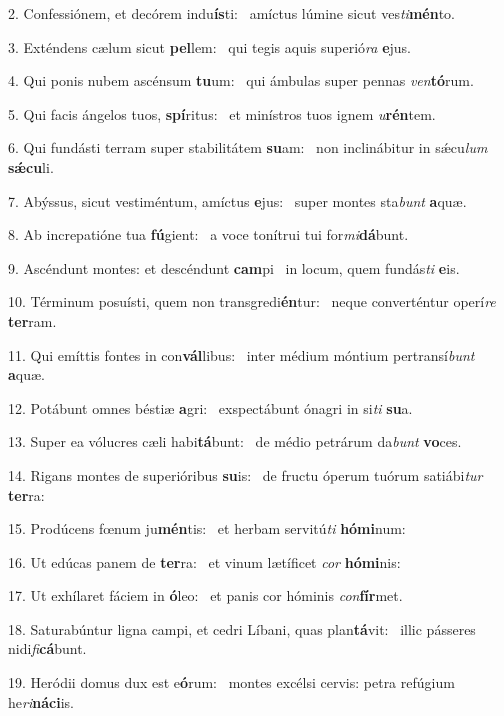 2. Confessiónem, et decórem indu\textbf{ís}ti: \ast\  amíctus lúmine sicut ves\textit{ti}\textbf{mén}to.\

3. Exténdens cælum sicut \textbf{pel}lem: \ast\  qui tegis aquis superió\textit{ra} \textbf{e}jus.\

4. Qui ponis nubem ascénsum \textbf{tu}um: \ast\  qui ámbulas super pennas \textit{ven}\textbf{tó}rum.\

5. Qui facis ángelos tuos, \textbf{spí}ritus: \ast\  et minístros tuos ignem \textit{u}\textbf{rén}tem.\

6. Qui fundásti terram super stabilitátem \textbf{su}am: \ast\  non inclinábitur in sǽcu\textit{lum} \textbf{sǽ}\textbf{cu}li.\

7. Abýssus, sicut vestiméntum, amíctus \textbf{e}jus: \ast\  super montes sta\textit{bunt} \textbf{a}quæ.\

8. Ab increpatióne tua \textbf{fú}gient: \ast\  a voce tonítrui tui for\textit{mi}\textbf{dá}bunt.\

9. Ascéndunt montes: et descéndunt \textbf{cam}pi \ast\  in locum, quem fundás\textit{ti} \textbf{e}is.\

10. Términum posuísti, quem non transgredi\textbf{én}tur: \ast\  neque converténtur operí\textit{re} \textbf{ter}ram.\

11. Qui emíttis fontes in con\textbf{vál}libus: \ast\  inter médium móntium pertransí\textit{bunt} \textbf{a}quæ.\

12. Potábunt omnes béstiæ \textbf{a}gri: \ast\  exspectábunt ónagri in si\textit{ti} \textbf{su}a.\

13. Super ea vólucres cæli habi\textbf{tá}bunt: \ast\  de médio petrárum da\textit{bunt} \textbf{vo}ces.\

14. Rigans montes de superióribus \textbf{su}is: \ast\  de fructu óperum tuórum satiábi\textit{tur} \textbf{ter}ra:\

15. Prodúcens fœnum ju\textbf{mén}tis: \ast\  et herbam servitú\textit{ti} \textbf{hó}\textbf{mi}num:\

16. Ut edúcas panem de \textbf{ter}ra: \ast\  et vinum lætíficet \textit{cor} \textbf{hó}\textbf{mi}nis:\

17. Ut exhílaret fáciem in \textbf{ó}leo: \ast\  et panis cor hóminis \textit{con}\textbf{fír}met.\

18. Saturabúntur ligna campi, et cedri Líbani, quas plan\textbf{tá}vit: \ast\  illic pásseres nidi\textit{fi}\textbf{cá}bunt.\

19. Heródii domus dux est e\textbf{ó}rum: \ast\  montes excélsi cervis: petra refúgium he\textit{ri}\textbf{ná}\textbf{ci}is.\


